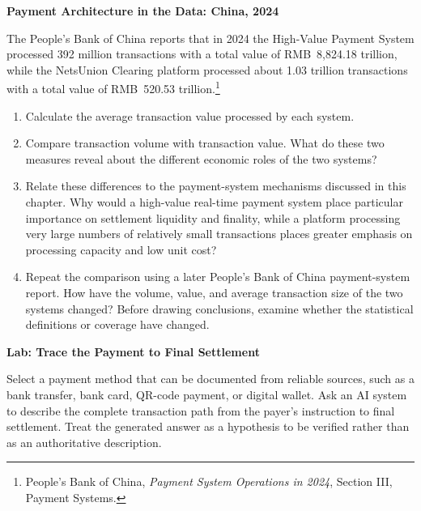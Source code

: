 

\textbf{Payment Architecture in the Data: China, 2024}

The People's Bank of China reports that in 2024 the High-Value Payment System processed 392 million transactions with a total value of RMB~8,824.18 trillion, while the NetsUnion Clearing platform processed about 1.03 trillion transactions with a total value of RMB~520.53 trillion.\footnote{People's Bank of China, \emph{Payment System Operations in 2024}, Section III, Payment Systems.}

\begin{enumerate}

\item Calculate the average transaction value processed by each system.

\item Compare transaction volume with transaction value. What do these
two measures reveal about the different economic roles of the two systems?

\item Relate these differences to the payment-system mechanisms discussed
in this chapter. Why would a high-value real-time payment system place
particular importance on settlement liquidity and finality, while a
platform processing very large numbers of relatively small transactions
places greater emphasis on processing capacity and low unit cost?

\item Repeat the comparison using a later People's Bank of China
payment-system report. How have the volume, value, and average transaction
size of the two systems changed? Before drawing conclusions, examine
whether the statistical definitions or coverage have changed.

\end{enumerate}



\textbf{Lab: Trace the Payment to Final Settlement}

Select a payment method that can be documented from reliable sources, such as a bank transfer, bank card, QR-code payment, or digital wallet. Ask an AI system to describe the complete transaction path from the payer's instruction to final settlement. Treat the generated answer as a hypothesis to be verified rather than as an authoritative description.

